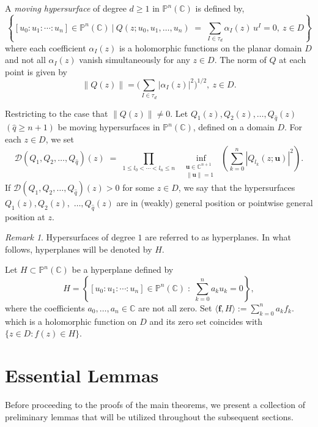 \documentclass[11pt, reqno]{amsart}
\theoremstyle{definition}
\theoremstyle{remark}
\newtheorem{remark}[theorem]{Remark}
\numberwithin{equation}{section}
\begin{document}
A \emph{moving hypersurface} of degree $d\geq 1$ in $\mathbb{P}^n(\mathbb{C})$
is defined by,
\begin{equation*}\left\{[u_0:u_1:\cdots:u_n]\in\mathbb P^n(\mathbb C)\ |\ Q(z;u_0,u_1,\ldots,u_n) \;=\; 
\sum_{I \in \tau_d} \alpha_I(z) \, u^I=0,\ z \in D\right\}\end{equation*}
where each coefficient $\alpha_I(z)$ is a holomorphic functions 
on the planar domain ${D}$ and not all $\alpha_I(z)$ vanish simultaneously for any 
$z\in D$. \smallskip
The norm of $Q$ at each point is given by
$$\|Q(z)\| = \Big( \sum_{I \in \tau_d} |\alpha_I(z)|^2 \Big)^{1/2},\ z\in D.$$\smallskip

Restricting to the case that $\|Q(z)\|\neq 0$. Let $Q_1(z),Q_2(z),\ldots,Q_{\hat q}(z)$ $(\hat q \geq n+1)$ be moving hypersurfaces in $\mathbb P^n(\mathbb{C})$, defined on a domain ${D}$. 
For each $z \in {D}$, we set
\begin{equation*}
\mathcal D(Q_1,Q_2,\ldots,Q_{\hat q})(z) \;=\; 
\prod_{1 \leq l_0 < \cdots < l_{n} \leq n}
\;\;\inf_{\substack{\mathbf u\in \mathbb{C}^{n+1}\\ \|\mathbf u\|=1\ \ }}
\left(\sum_{k=0}^{n}|Q_{l_k}(z;\mathbf u)|^2  \right).
\end{equation*}
If $\mathcal D(Q_1,Q_2,\ldots,Q_{\hat q})(z) > 0$ for some $z \in D$, 
we say that the hypersurfaces $Q_1(z),Q_2(z),$ $\ldots,Q_{\hat q}(z)$ are in (weakly)
general position or pointwise general position at $z$.
\begin{remark}
Hypersurfaces of degree $1$ are referred to as hyperplanes. In what follows,  hyperplanes will be denoted by $H$.
\end{remark}

Let $H \subset \mathbb{P}^n(\mathbb{C})$ be a hyperplane defined by
\begin{equation*}
H = \left\{ [u_0 : u_1 : \cdots : u_n] \in \mathbb{P}^n(\mathbb{C}) \; : \; \sum_{k=0}^n a_k u_k = 0 \right\},
\end{equation*}
where the coefficients $a_0, \dots, a_n \in \mathbb{C}$ are not all zero.
Set
$\langle \mathbf{f}, H \rangle := \sum_{k=0}^n a_k f_k.$
which is a holomorphic function on $D$ and its zero set coincides with $\{z\in D: f(z)\in H\}$.

\section{Essential Lemmas}
Before proceeding to the proofs of the main theorems, we present a collection of preliminary lemmas that will be utilized throughout the subsequent sections. \smallskip
\end{document}
